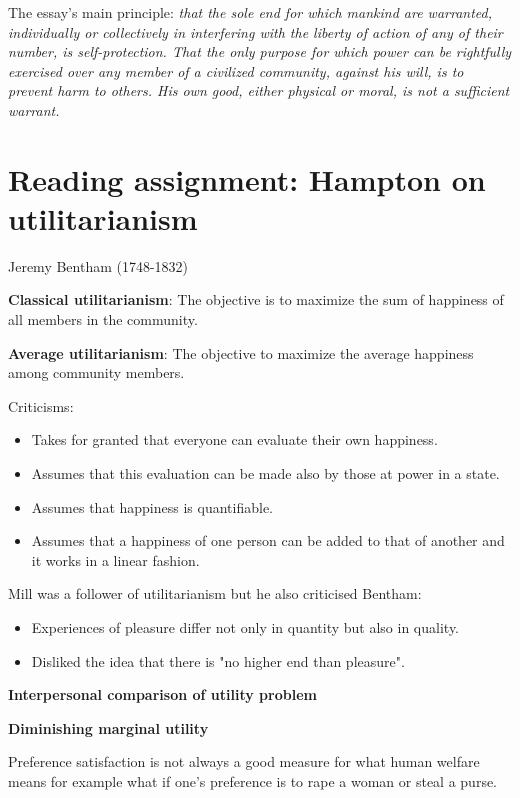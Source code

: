 The essay's main principle: \textit{that the sole end for which mankind are
warranted, individually or collectively in interfering with the liberty of
action of any of their number, is self-protection. That the only purpose for
which power can be rightfully exercised over any member of a civilized
community, against his will, is to prevent harm to others. His own good,
either physical or moral, is not a sufficient warrant.}

\section{Reading assignment: Hampton on utilitarianism}

Jeremy Bentham (1748-1832)

\textbf{Classical utilitarianism}: The objective is to maximize the sum of
happiness of all members in the community.

\textbf{Average utilitarianism}: The objective to maximize the average
happiness among community members.

Criticisms:

\begin{itemize}
	\item Takes for granted that everyone can evaluate their own happiness.
	\item Assumes that this evaluation can be made also by those at power
	in a state.
	\item Assumes that happiness is quantifiable.
	\item Assumes that a happiness of one person can be added to that of
	another and it works in a linear fashion.
\end{itemize}

Mill was a follower of utilitarianism but he also criticised Bentham:

\begin{itemize}
	\item Experiences of pleasure differ not only in quantity but also in
	quality.
	\item Disliked the idea that there is "no higher end than pleasure".
\end{itemize}

\textbf{Interpersonal comparison of utility problem}

\textbf{Diminishing marginal utility}

Preference satisfaction is not always a good measure for what human welfare
means for example what if one's preference is to rape a woman or steal a purse.
